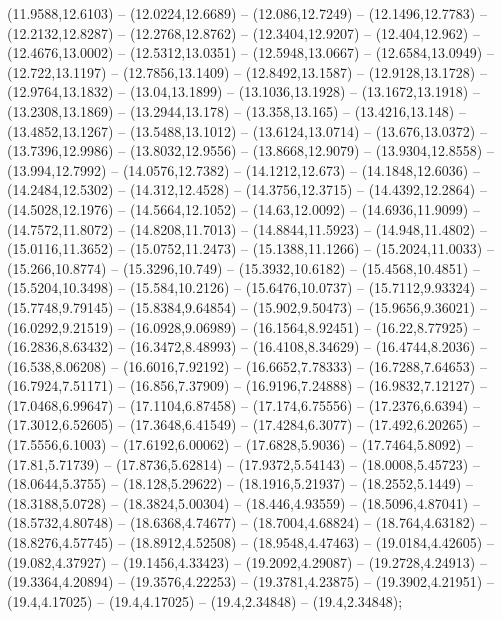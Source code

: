 {  (11.9588,12.6103) -- (12.0224,12.6689) -- (12.086,12.7249) -- (12.1496,12.7783) -- (12.2132,12.8287) -- (12.2768,12.8762) -- (12.3404,12.9207) -- (12.404,12.962) -- (12.4676,13.0002) -- (12.5312,13.0351) -- (12.5948,13.0667) -- (12.6584,13.0949) --
  (12.722,13.1197) -- (12.7856,13.1409) -- (12.8492,13.1587) -- (12.9128,13.1728) -- (12.9764,13.1832) -- (13.04,13.1899) -- (13.1036,13.1928) -- (13.1672,13.1918) -- (13.2308,13.1869) -- (13.2944,13.178) -- (13.358,13.165) -- (13.4216,13.148) --
  (13.4852,13.1267) -- (13.5488,13.1012) -- (13.6124,13.0714) -- (13.676,13.0372) -- (13.7396,12.9986) -- (13.8032,12.9556) -- (13.8668,12.9079) -- (13.9304,12.8558) -- (13.994,12.7992) -- (14.0576,12.7382) -- (14.1212,12.673) -- (14.1848,12.6036) --
  (14.2484,12.5302) -- (14.312,12.4528) -- (14.3756,12.3715) -- (14.4392,12.2864) -- (14.5028,12.1976) -- (14.5664,12.1052) -- (14.63,12.0092) -- (14.6936,11.9099) -- (14.7572,11.8072) -- (14.8208,11.7013) -- (14.8844,11.5923) -- (14.948,11.4802) --
  (15.0116,11.3652) -- (15.0752,11.2473) -- (15.1388,11.1266) -- (15.2024,11.0033) -- (15.266,10.8774) -- (15.3296,10.749) -- (15.3932,10.6182) -- (15.4568,10.4851) -- (15.5204,10.3498) -- (15.584,10.2126) -- (15.6476,10.0737) -- (15.7112,9.93324) --
  (15.7748,9.79145) -- (15.8384,9.64854) -- (15.902,9.50473) -- (15.9656,9.36021) -- (16.0292,9.21519) -- (16.0928,9.06989) -- (16.1564,8.92451) -- (16.22,8.77925) -- (16.2836,8.63432) -- (16.3472,8.48993) -- (16.4108,8.34629) -- (16.4744,8.2036) --
  (16.538,8.06208) -- (16.6016,7.92192) -- (16.6652,7.78333) -- (16.7288,7.64653) -- (16.7924,7.51171) -- (16.856,7.37909) -- (16.9196,7.24888) -- (16.9832,7.12127) -- (17.0468,6.99647) -- (17.1104,6.87458) -- (17.174,6.75556) -- (17.2376,6.6394) --
  (17.3012,6.52605) -- (17.3648,6.41549) -- (17.4284,6.3077) -- (17.492,6.20265) -- (17.5556,6.1003) -- (17.6192,6.00062) -- (17.6828,5.9036) -- (17.7464,5.8092) -- (17.81,5.71739) -- (17.8736,5.62814) -- (17.9372,5.54143) -- (18.0008,5.45723) --
  (18.0644,5.3755) -- (18.128,5.29622) -- (18.1916,5.21937) -- (18.2552,5.1449) -- (18.3188,5.0728) -- (18.3824,5.00304) -- (18.446,4.93559) -- (18.5096,4.87041) -- (18.5732,4.80748) -- (18.6368,4.74677) -- (18.7004,4.68824) -- (18.764,4.63182) --
  (18.8276,4.57745) -- (18.8912,4.52508) -- (18.9548,4.47463) -- (19.0184,4.42605) -- (19.082,4.37927) -- (19.1456,4.33423) -- (19.2092,4.29087) -- (19.2728,4.24913) -- (19.3364,4.20894) -- (19.3576,4.22253) -- (19.3781,4.23875) -- (19.3902,4.21951)
  -- (19.4,4.17025) -- (19.4,4.17025) -- (19.4,2.34848) -- (19.4,2.34848);

}
